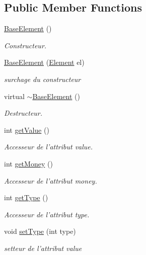 \subsection*{Public Member Functions}
\begin{DoxyCompactItemize}
\item 
\hyperlink{classBaseElement_a1569ee70076588b3b6d28e4e17257de0}{Base\-Element} ()
\begin{DoxyCompactList}\small\item\em Constructeur. \end{DoxyCompactList}\item 
\hyperlink{classBaseElement_a4b5096047820c9447786bad867495eec}{Base\-Element} (\hyperlink{classElement}{Element} el)
\begin{DoxyCompactList}\small\item\em surchage du constructeur \end{DoxyCompactList}\item 
virtual \hyperlink{classBaseElement_ad670a437f6c567beb80294850de2ff13}{$\sim$\-Base\-Element} ()
\begin{DoxyCompactList}\small\item\em Destructeur. \end{DoxyCompactList}\item 
int \hyperlink{classBaseElement_a7ffb8e8f1cf88ae0a8489d8e653301a2}{get\-Value} ()
\begin{DoxyCompactList}\small\item\em Accesseur de l'attribut value. \end{DoxyCompactList}\item 
int \hyperlink{classBaseElement_ad1b8117c4a21129c759bbee82e024347}{get\-Money} ()
\begin{DoxyCompactList}\small\item\em Accesseur de l'attribut money. \end{DoxyCompactList}\item 
int \hyperlink{classBaseElement_a419e6be2effe678ce8d762d267f24840}{get\-Type} ()
\begin{DoxyCompactList}\small\item\em Accesseur de l'attribut type. \end{DoxyCompactList}\item 
void \hyperlink{classBaseElement_aa05ade655a8c57b870971fdcc5ae45e4}{set\-Type} (int type)
\begin{DoxyCompactList}\small\item\em setteur de l'attribut value \end{DoxyCompactList}\end{DoxyCompactItemize}

